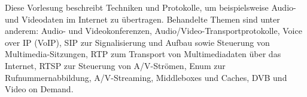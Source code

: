 \begin{module}
\begin{learningoutcomes}
\end{learningoutcomes}

\begin{content}
Diese Vorlesung beschreibt Techniken und Protokolle, um beispielsweise Audio- und Videodaten im Internet zu übertragen. Behandelte Themen sind unter anderem: Audio- und Videokonferenzen, Audio/Video-Transportprotokolle, Voice over IP (VoIP), SIP zur Signalisierung und Aufbau sowie Steuerung von Multimedia-Sitzungen, RTP zum Transport von Multimediadaten über das Internet, RTSP zur Steuerung von A/V-Strömen, Enum zur Rufnummernabbildung, A/V-Streaming, Middleboxes und Caches, DVB und Video on Demand.


\end{content}



\end{module}

